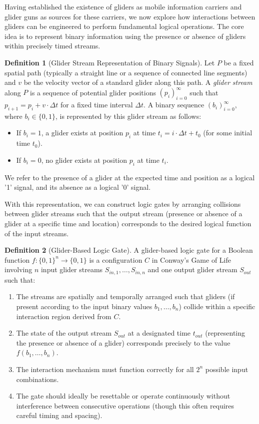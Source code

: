 \documentclass{article}
\theoremstyle{definition}
\newtheorem{definition}{Definition}[section]
\theoremstyle{plain}
\theoremstyle{plain}
\begin{document}
Having established the existence of gliders as mobile information carriers and glider guns as sources for these carriers, we now explore how interactions between gliders can be engineered to perform fundamental logical operations. The core idea is to represent binary information using the presence or absence of gliders within precisely timed streams.

\begin{definition}[Glider Stream Representation of Binary Signals]
Let $P$ be a fixed spatial path (typically a straight line or a sequence of connected line segments) and $v$ be the velocity vector of a standard glider along this path. A \textit{glider stream} along $P$ is a sequence of potential glider positions $(p_i)_{i=0}^{\infty}$ such that $p_{i+1} = p_i + v \cdot \Delta t$ for a fixed time interval $\Delta t$. A binary sequence $(b_i)_{i=0}^{\infty}$, where $b_i \in \{0, 1\}$, is represented by this glider stream as follows:
\begin{itemize}
  \item If $b_i = 1$, a glider exists at position $p_i$ at time $t_i = i \cdot \Delta t + t_0$ (for some initial time $t_0$).
  \item If $b_i = 0$, no glider exists at position $p_i$ at time $t_i$.
\end{itemize}
We refer to the presence of a glider at the expected time and position as a logical '1' signal, and its absence as a logical '0' signal.
\end{definition}

With this representation, we can construct logic gates by arranging collisions between glider streams such that the output stream (presence or absence of a glider at a specific time and location) corresponds to the desired logical function of the input streams.

\begin{definition}[Glider-Based Logic Gate]
A glider-based logic gate for a Boolean function $f: \{0, 1\}^n \to \{0, 1\}$ is a configuration $C$ in Conway's Game of Life involving $n$ input glider streams $S_{in,1}, \dots, S_{in,n}$ and one output glider stream $S_{out}$ such that:
\begin{enumerate}
  \item The streams are spatially and temporally arranged such that gliders (if present according to the input binary values $b_1, \dots, b_n$) collide within a specific interaction region derived from $C$.
  \item The state of the output stream $S_{out}$ at a designated time $t_{out}$ (representing the presence or absence of a glider) corresponds precisely to the value $f(b_1, \dots, b_n)$.
  \item The interaction mechanism must function correctly for all $2^n$ possible input combinations.
  \item The gate should ideally be resettable or operate continuously without interference between consecutive operations (though this often requires careful timing and spacing).
\end{enumerate}
\end{definition}
\end{document}
